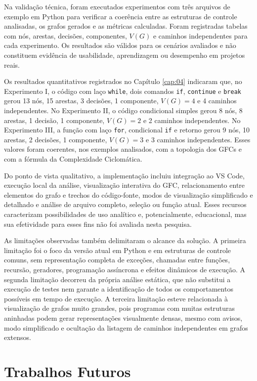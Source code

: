 Na validação técnica, foram executados experimentos com três arquivos de exemplo em Python para verificar a coerência entre as estruturas de controle analisadas, os grafos gerados e as métricas calculadas. Foram registradas tabelas com nós, arestas, decisões, componentes, \(V(G)\) e caminhos independentes para cada experimento. Os resultados são válidos para os cenários avaliados e não constituem evidência de usabilidade, aprendizagem ou desempenho em projetos reais.

Os resultados quantitativos registrados no Capítulo \ref{cap:04} indicaram que, no Experimento I, o código com laço \texttt{while}, dois comandos \texttt{if}, \texttt{continue} e \texttt{break} gerou 13 nós, 15 arestas, 3 decisões, 1 componente, \(V(G)=4\) e 4 caminhos independentes. No Experimento II, o código condicional simples gerou 8 nós, 8 arestas, 1 decisão, 1 componente, \(V(G)=2\) e 2 caminhos independentes. No Experimento III, a função com laço \texttt{for}, condicional \texttt{if} e retorno gerou 9 nós, 10 arestas, 2 decisões, 1 componente, \(V(G)=3\) e 3 caminhos independentes. Esses valores foram coerentes, nos exemplos analisados, com a topologia dos GFCs e com a fórmula da Complexidade Ciclomática.

Do ponto de vista qualitativo, a implementação incluiu integração ao VS Code, execução local da análise, visualização interativa do GFC, relacionamento entre elementos do grafo e trechos do código-fonte, modos de visualização simplificado e detalhado e análise de arquivo completo, seleção ou função atual. Esses recursos caracterizam possibilidades de uso analítico e, potencialmente, educacional, mas sua efetividade para esses fins não foi avaliada nesta pesquisa.

As limitações observadas também delimitaram o alcance da solução. A primeira limitação foi o foco da versão atual em Python e em estruturas de controle comuns, sem representação completa de exceções, chamadas entre funções, recursão, geradores, programação assíncrona e efeitos dinâmicos de execução. A segunda limitação decorreu da própria análise estática, que não substitui a execução de testes nem garante a identificação de todos os comportamentos possíveis em tempo de execução. A terceira limitação esteve relacionada à visualização de grafos muito grandes, pois programas com muitas estruturas aninhadas podem gerar representações visualmente densas, mesmo com avisos, modo simplificado e ocultação da listagem de caminhos independentes em grafos extensos.

\section{Trabalhos Futuros}

